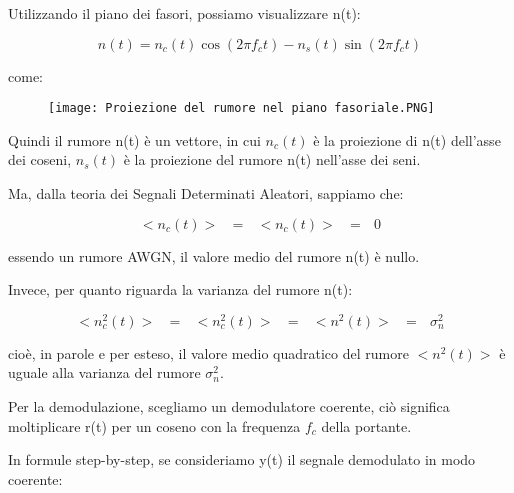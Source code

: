 \newpage 

Utilizzando il piano dei fasori, 
possiamo visualizzare n(t): 

{
    \Large 
    \begin{equation}
        n(t)
        =
        n_c (t) \cos(2 \pi f_c t)
        - 
        n_s(t) \sin(2 \pi f_c t)
    \end{equation}
}

come: 

\begin{figure}[h]
    \centering
    \texttt{[image: Proiezione del rumore nel piano fasoriale.PNG]}
\end{figure}

Quindi il rumore n(t) è un vettore, in cui $n_c (t)$ è la proiezione di n(t) dell'asse dei coseni, 
$n_s (t)$ è la proiezione del rumore n(t) nell'asse dei seni. \newline 

Ma, dalla teoria dei Segnali Determinati Aleatori, sappiamo che: 

{
    \Large 
    \begin{equation}
        < n_c (t) > \text{ }
        =
        \text{ }
        < n_c (t) > 
        \text{ }
        = 
        \text{ }
        0
    \end{equation}
}

essendo un rumore AWGN, il valore medio del rumore n(t) è nullo. \newline 

Invece, per quanto riguarda la varianza del rumore n(t): 


{
    \Large 
    \begin{equation}
        < n_c ^{2} (t) > \text{ }
        =
        \text{ }
        < n_c ^{2} (t) > 
        \text{ }
        = 
        \text{ }
        < n ^{2} (t) > 
        \text{ }
        = 
        \text{ }
        \sigma_n ^{2}
    \end{equation}
}

cioè, in parole e per esteso, il valore medio quadratico del rumore $< n ^{2} (t) > $ è uguale alla varianza del rumore $\sigma_n ^{2}$. \newline 

Per la demodulazione, scegliamo un demodulatore coerente, ciò significa moltiplicare r(t) per un coseno con la frequenza $f_c$ della portante. \newline  

In formule step-by-step, se consideriamo y(t) il segnale demodulato in modo coerente: 

